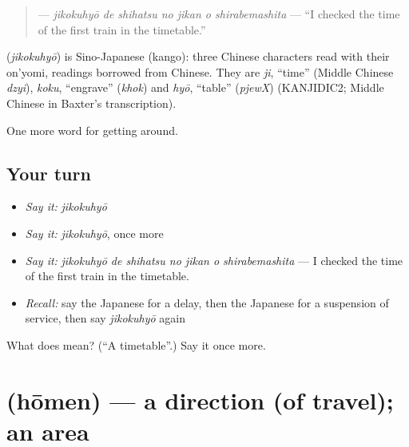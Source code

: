 \begin{quote}
\textbf{   } — \emph{jikokuhyō de shihatsu no jikan o shirabemashita} — \textquotedblleft{}I checked the time of the first train in the timetable.\textquotedblright{}
\end{quote}

\begin{cousinweb}
\textbf{} (\emph{jikokuhyō}) is Sino-Japanese (kango): three Chinese characters read with their on'yomi, readings borrowed from Chinese. They are \emph{ji}, \textquotedblleft{}time\textquotedblright{} (Middle Chinese \emph{dzyi}), \emph{koku}, \textquotedblleft{}engrave\textquotedblright{} (\emph{khok}) and \emph{hyō}, \textquotedblleft{}table\textquotedblright{} (\emph{pjewX}) (KANJIDIC2; Middle Chinese in Baxter's transcription).
\end{cousinweb}

\begin{grammarlens}[title={What you've built}]
One more word for getting around.
\end{grammarlens}

\subsection*{Your turn}
\begin{itemize}
\raggedright
  \item \emph{Say it:} \emph{jikokuhyō}
  \item \emph{Say it:} \emph{jikokuhyō}, once more
  \item \emph{Say it:} \emph{jikokuhyō de shihatsu no jikan o shirabemashita} — I checked the time of the first train in the timetable.
  \item \emph{Recall:} say the Japanese for a delay, then the Japanese for a suspension of service, then say \emph{jikokuhyō} again
\end{itemize}

\begin{tcolorbox}[breakable,colback=teal!4,colframe=teal!35!black,title={Before you move on}]
What does  mean? (\textquotedblleft{}A timetable\textquotedblright{}.) Say it once more.
\end{tcolorbox}
\section[\texorpdfstring{\ja{ほうめん} (hōmen)}{ほうめん (hōmen)}]{ (hōmen) — a direction (of travel); an area}

